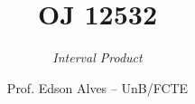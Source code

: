 \title{OJ 12532}
\subtitle{\textit{Interval Product}}
\author{Prof. Edson Alves -- UnB/FCTE}
\date{}

